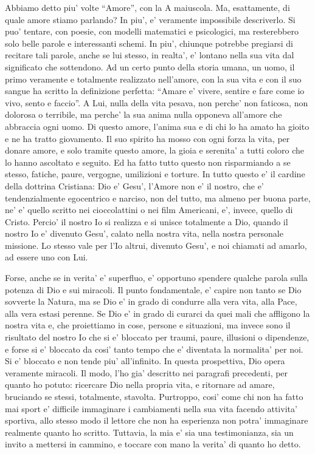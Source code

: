 Abbiamo detto piu' volte ``Amore'', con la A maiuscola. Ma, esattamente, di quale amore stiamo parlando? In piu', e' veramente impossibile descriverlo. Si puo' tentare, con poesie, con modelli matematici e psicologici, ma resterebbero solo belle parole e interessanti schemi. In piu', chiunque potrebbe pregiarsi di recitare tali parole, anche se lui stesso, in realta', e' lontano nella sua vita dal significato che sottendono. Ad un certo punto della storia umana, un uomo, il primo veramente e totalmente realizzato nell'amore, con la sua vita e con il suo sangue ha scritto la definizione perfetta: ``Amare e' vivere, sentire e fare come io vivo, sento e faccio''.
A Lui, nulla della vita pesava, non perche' non faticosa, non dolorosa o terribile,
ma perche' la sua anima nulla opponeva all'amore che abbraccia ogni uomo.
Di questo amore, l'anima sua e di chi lo ha amato ha gioito e ne ha tratto giovamento.
Il suo spirito ha mosso con ogni forza la vita, per donare amore, e solo tramite questo amore,
la gioia e serenita' a tutti coloro che lo hanno ascoltato e seguito.
Ed ha fatto tutto questo non risparmiando a se stesso, fatiche, paure, vergogne, umilizioni e torture.
In tutto questo e' il cardine della dottrina Cristiana: Dio e' Gesu', l'Amore non e' il nostro, che e' tendenzialmente egocentrico e narciso, non del tutto, ma almeno per buona parte, ne' e' quello scritto nei cioccolattini o nei film Americani, e', invece, quello di Cristo.
Percio' il nostro Io si realizza e si unisce totalmente a Dio, quando il nostro Io e' divenuto Gesu',
calato nella nostra vita, nella nostra personale missione.
Lo stesso vale per l'Io altrui, divenuto Gesu', e noi chiamati ad amarlo, ad essere uno con Lui.

Forse, anche se in verita' e' superfluo, e' opportuno spendere qualche parola sulla potenza di Dio e sui miracoli. Il punto fondamentale, e' capire non tanto se Dio sovverte la Natura, ma se Dio e' in grado di condurre alla vera vita, alla Pace, alla vera estasi perenne. Se Dio e' in grado di curarci da quei mali che affligono la nostra vita e, che proiettiamo in cose, persone e situazioni, ma invece sono il risultato del nostro Io che si e' bloccato per traumi, paure, illusioni o dipendenze, e forse si e' bloccato da cosi' tanto tempo che e' diventata la normalita' per noi. Si e' bloccato e non tende piu' all'infinito. In questa prospettiva, Dio opera veramente miracoli. Il modo, l'ho gia' descritto nei paragrafi precedenti, per quanto ho potuto: ricercare Dio nella propria vita, e ritornare ad amare, bruciando se stessi, totalmente, stavolta. Purtroppo, cosi' come chi non ha fatto mai sport e' difficile immaginare i cambiamenti nella sua vita facendo attivita' sportiva, allo stesso modo il lettore che non ha esperienza non potra' immaginare realmente quanto ho scritto. Tuttavia, la mia e' sia una testimonianza, sia un invito a mettersi in cammino, e toccare con mano la verita' di quanto ho detto.



